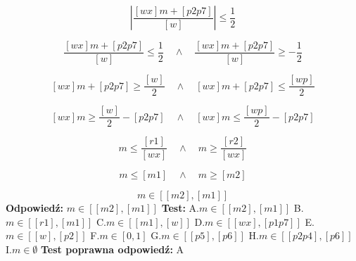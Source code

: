 \documentclass[12pt, a4paper]{article}
\theoremstyle{definition} %
\newcommand{\rozwStop}{\newline}                                            %
\newcommand{\odpStart}{\noindent \textbf{Odpowiedź:}\newline}    %
\newcommand{\odpStop}{\newline}                                             %
\newcommand{\testStart}{\noindent \textbf{Test:}\newline} %
\newcommand{\testStop}{\newline} %
\newcommand{\kluczStart}{\noindent \textbf{Test poprawna odpowiedź:}\newline} %
\newcommand{\kluczStop}{\newline} %
\begin{document}
$$\left|\frac{[wx]m+[p2p7]}{[w]}\right|\leq\frac{1}{2}$$

$$\frac{[wx]m+[p2p7]}{[w]}\leq\frac{1}{2} \quad \land \quad \frac{[wx]m+[p2p7]}{[w]}\geq -\frac{1}{2}$$

$$[wx]m+[p2p7]\geq \frac{[w]}{2} \quad \land \quad [wx]m+[p2p7]\leq \frac{[wp]}{2} $$

$$[wx]m\geq \frac{[w]}{2} -[p2p7] \quad \land \quad [wx]m\leq \frac{[wp]}{2}-[p2p7] $$

$$m\leq \frac{[r1]}{[wx]} \quad \land \quad m\geq \frac{[r2]}{[wx]} $$

$$m\leq [m1] \quad \land \quad m\geq [m2]$$

$$m\in [[m2], [m1]]$$
\rozwStop
\odpStart
$m\in [[m2], [m1]]$
\odpStop
\testStart
A.$m\in [[m2], [m1]]$
B.$m\in [[r1], [m1]]$
C.$m\in [[m1], [w]]$
D.$m\in [[wx], [p1p7]]$
E.$m\in [[w], [p2]]$
F.$m\in [0, 1]$
G.$m\in [[p5], [p6]]$
H.$m\in [[p2p4], [p6]]$
I.$m\in \emptyset$
\testStop
\kluczStart
A
\kluczStop
\end{document}

